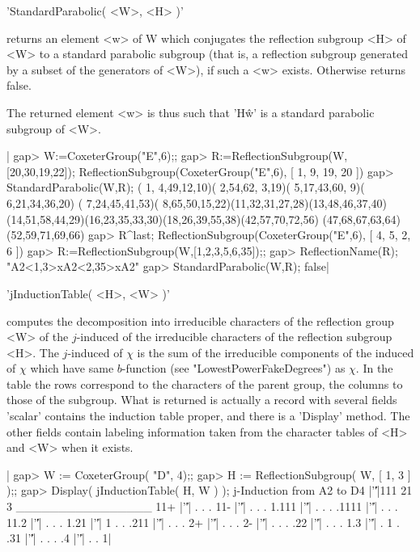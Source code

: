 
'StandardParabolic( <W>, <H> )'

returns an element <w> of W which conjugates the reflection subgroup <H> of
<W>  to  a  standard  parabolic  subgroup  (that  is, a reflection subgroup
generated  by a  subset of  the generators  of <W>),  if such a <w> exists.
Otherwise returns false.

The  returned element <w> is thus such  that 'H\^w' is a standard parabolic
subgroup of <W>.

|    gap> W:=CoxeterGroup("E",6);;
    gap> R:=ReflectionSubgroup(W,[20,30,19,22]);
    ReflectionSubgroup(CoxeterGroup("E",6), [ 1, 9, 19, 20 ])
    gap> StandardParabolic(W,R);
    ( 1, 4,49,12,10)( 2,54,62, 3,19)( 5,17,43,60, 9)( 6,21,34,36,20)
    ( 7,24,45,41,53)( 8,65,50,15,22)(11,32,31,27,28)(13,48,46,37,40)
    (14,51,58,44,29)(16,23,35,33,30)(18,26,39,55,38)(42,57,70,72,56)
    (47,68,67,63,64)(52,59,71,69,66)
    gap> R^last;
    ReflectionSubgroup(CoxeterGroup("E",6), [ 4, 5, 2, 6 ])
    gap> R:=ReflectionSubgroup(W,[1,2,3,5,6,35]);;
    gap> ReflectionName(R);
    "A2<1,3>xA2<2,35>xA2"
    gap> StandardParabolic(W,R);
    false|


'jInductionTable( <H>, <W> )'

computes the decomposition into irreducible characters of the reflection
group  <W> of  the  $j$-induced  of the  irreducible  characters of  the
reflection subgroup  <H>. The $j$-induced  of $\chi$  is the sum  of the
irreducible  components  of  the  induced  of  $\chi$  which  have  same
$b$-function (see "LowestPowerFakeDegrees") as  $\chi$. In the table the
rows correspond  to the characters of  the parent group, the  columns to
those  of the  subgroup.  What is  returned is  actually  a record  with
several fields\: 'scalar' contains the induction table proper, and there
is a  'Display' method.  The other  fields contain  labeling information
taken from the character tables of <H> and <W> when it exists.

|    gap> W := CoxeterGroup( "D", 4);;
    gap> H := ReflectionSubgroup( W, [ 1, 3 ] );;
    gap> Display( jInductionTable( H, W ) );
    j-Induction from A2 to D4
          |'\|'|111 21 3
    ________________
    11+   |'\|'|  .  . .
    11-   |'\|'|  .  . .
    1.111 |'\|'|  .  . .
    .1111 |'\|'|  .  . .
    11.2  |'\|'|  .  . .
    1.21  |'\|'|  1  . .
    .211  |'\|'|  .  . .
    2+    |'\|'|  .  . .
    2-    |'\|'|  .  . .
    .22   |'\|'|  .  . .
    1.3   |'\|'|  .  1 .
    .31   |'\|'|  .  . .
    .4    |'\|'|  .  . 1|

